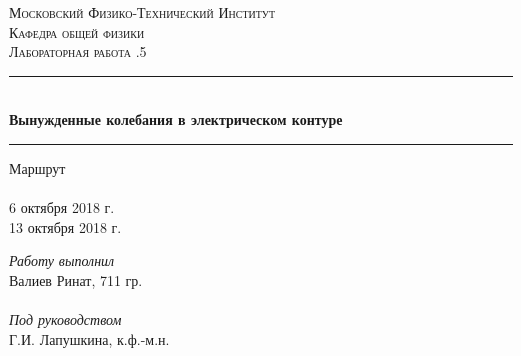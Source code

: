 \begin{titlepage}

\pagestyle{empty}	%

\begin{center}
	\textsc{\LARGE Московский Физико-Технический Институт}\\[1,5cm]
	\textsc{\Large Кафедра общей физики}\\[0,5cm]
	\textsc{\large Лабораторная работа .5}\\[2.5cm]

	\noindent\rule{\textwidth}{1pt}
	\\[0.5cm]
	{ \huge \bfseries Вынужденные колебания в электрическом контуре}
	\\[0.1cm]
	\noindent\rule{\textwidth}{1pt}
\end{center}

\vfill

\begin{minipage}[b]{0.3\textwidth}
	Маршрут \\\\
	6 октября 2018 г.\\
	13 октября 2018 г.
\end{minipage}
\hfill
\begin{minipage}[b]{0.33\textwidth}
	\textit{Работу выполнил}\\
	Валиев Ринат, 711 гр.\\\\
	\textit{Под руководством}\\
	Г.И. Лапушкина, к.ф.-м.н.
\end{minipage}

\end{titlepage}

\pagestyle{plain}		%
\setcounter{page}{2}	%
